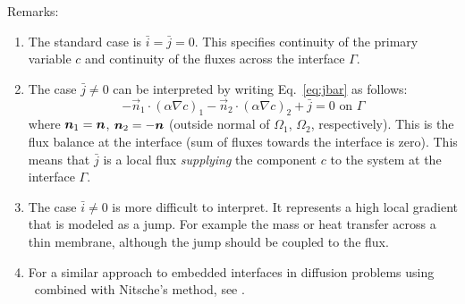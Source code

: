 Remarks:
\begin{enumerate}
   \item The standard case is $\bar i=\bar j=0$. This specifies continuity of
         the primary variable $c$ and continuity of the fluxes across the
         interface $\Gamma$.
   \item The case $\bar j\neq0$ can be interpreted by writing
         Eq.~\eqref{eq:jbar} as follows:      
\[
    -\vec n_1\cdot(\alpha\nabla c)_1
    -\vec n_2\cdot(\alpha\nabla c)_2+\bar j=0\text{ on }\Gamma
\]
where $\boldsymbol{n}_1=\boldsymbol{n}$, $\boldsymbol{n}_2=-\boldsymbol{n}$ (outside normal of $\Omega_1$,
$\Omega_2$, respectively). This is the flux balance at the interface (sum of
fluxes towards the interface is zero).
 This means that $\bar j$ is a local flux
\emph{supplying} the component $c$ to the system at the
 interface $\Gamma$.
    \item The case $\bar i\neq0$ is more difficult to interpret. It represents
a high local gradient that is modeled as a jump. For example the mass or heat
 transfer across a thin membrane, although the jump should be coupled to the
flux.
    \item For a similar approach to embedded interfaces in 
          diffusion problems using \xfem\ combined with Nitsche's method, see
          \cite{dolbow2009,dolbow2010}.
\end{enumerate}

